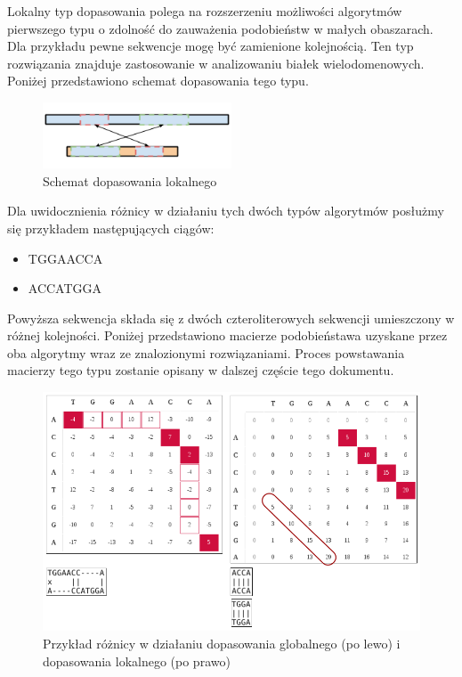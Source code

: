 \documentclass[a4paper,12pt]{article}
\newenvironment{lista}{
\begin{itemize}
  \setlength{\itemsep}{1pt}
  \setlength{\parskip}{0pt}
  \setlength{\parsep}{0pt}
}{\end{itemize}}
\begin{document}
Lokalny typ dopasowania polega na rozszerzeniu możliwości algorytmów pierwszego typu o zdolność do zauważenia podobieństw w małych obaszarach. Dla przykładu pewne sekwencje mogę być zamienione kolejnością. Ten typ rozwiązania znajduje zastosowanie w analizowaniu białek wielodomenowych.  Poniżej przedstawiono schemat dopasowania tego typu. 

\begin{figure}[h]
  \vspace{5pt}
  \centering
  \begin{center}
  \includegraphics[width=0.5\textwidth]{images/Dopasowanie_lokalne.png}
  \end{center}
  \caption{Schemat dopasowania lokalnego}
 \end{figure}
 
 
Dla uwidocznienia różnicy w działaniu tych dwóch typów algorytmów posłużmy się przykładem następujących ciągów:
\begin{lista}
 \item TGGAACCA
\item ACCATGGA
\end{lista}

Powyższa sekwencja składa się z dwóch czteroliterowych sekwencji umieszczony w różnej kolejności. Poniżej przedstawiono macierze podobieństawa uzyskane przez oba algorytmy wraz ze znalozionymi rozwiązaniami. Proces powstawania macierzy tego typu zostanie opisany w dalszej częście tego dokumentu. 


\begin{figure}[h]
  \vspace{5pt}
  \centering
  \begin{center}
  \includegraphics[width=1.0\textwidth]{images/Globalne_lokalne_przyklad.png}
  \end{center}
  \caption{Przykład różnicy w działaniu dopasowania globalnego (po lewo) i dopasowania lokalnego (po prawo)}
 \end{figure}
\end{document}
